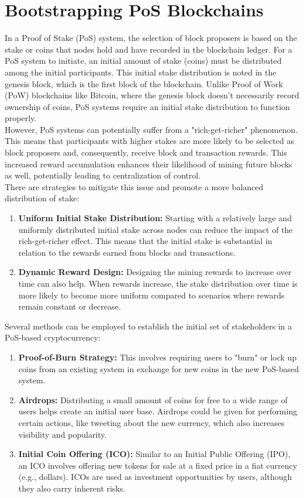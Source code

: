 \section{Bootstrapping PoS Blockchains}
In a Proof of Stake (PoS) system, the selection of block proposers is based on the stake or coins that nodes hold and have recorded in the blockchain ledger. For a PoS system to initiate, an initial amount of stake (coins) must be distributed among the initial participants. This initial stake distribution is noted in the genesis block, which is the first block of the blockchain. Unlike Proof of Work (PoW) blockchains like Bitcoin, where the genesis block doesn't necessarily record ownership of coins, PoS systems require an initial stake distribution to function properly.\\
However, PoS systems can potentially suffer from a "rich-get-richer" phenomenon. This means that participants with higher stakes are more likely to be selected as block proposers and, consequently, receive block and transaction rewards. This increased reward accumulation enhances their likelihood of mining future blocks as well, potentially leading to centralization of control.\\
There are strategies to mitigate this issue and promote a more balanced distribution of stake:
\begin{enumerate}
	\item \textbf{Uniform Initial Stake Distribution:} Starting with a relatively large and uniformly distributed initial stake across nodes can reduce the impact of the rich-get-richer effect. This means that the initial stake is substantial in relation to the rewards earned from blocks and transactions.
	\item \textbf{Dynamic Reward Design:} Designing the mining rewards to increase over time can also help. When rewards increase, the stake distribution over time is more likely to become more uniform compared to scenarios where rewards remain constant or decrease.
\end{enumerate}
Several methods can be employed to establish the initial set of stakeholders in a PoS-based cryptocurrency:
\begin{enumerate}
	\item \textbf{Proof-of-Burn Strategy:} This involves requiring users to "burn" or lock up coins from an existing system in exchange for new coins in the new PoS-based system.
	\item \textbf{Airdrops:} Distributing a small amount of coins for free to a wide range of users helps create an initial user base. Airdrops could be given for performing certain actions, like tweeting about the new currency, which also increases visibility and popularity.
	\item \textbf{Initial Coin Offering (ICO):} Similar to an Initial Public Offering (IPO), an ICO involves offering new tokens for sale at a fixed price in a fiat currency (e.g., dollars). ICOs are used as investment opportunities by users, although they also carry inherent risks.
\end{enumerate}
